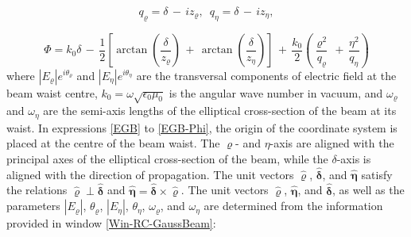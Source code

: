 \begin{equation}\label{EGB-qs}
	q_{\varrho} = \delta\,-\,iz_{\varrho}, \,\,\, q_{\eta} = \delta\,-\,iz_{\eta},
\end{equation}

\begin{equation}\label{EGB-Phi}
	\Phi = k_{0}\delta\,-\,\dfrac{1}{2}\left[\arctan\left(\frac{\delta}{z_{\varrho}}\right)\,+\,\arctan\left(\frac{\delta}{z_{\eta}}\right)\right]\,+\,\dfrac{k_{0}}{2}\left(\frac{\varrho^{2}}{q_{\varrho}}\,+\,\frac{\eta^{2}}{q_{\eta}}\right)
\end{equation}
where $|E_{\varrho}|e^{i\theta_{\varrho}}$ and $|E_{\eta}|e^{i\theta_{\eta}}$ are the transversal components of electric field at the beam waist centre, $k_{0} = \omega\sqrt{\epsilon_{0}\mu_{0}}$ is the angular wave number in vacuum, and $\omega_{\varrho}$ and $\omega_{\eta}$ are the semi-axis lengths of the elliptical cross-section of the beam at its waist. In expressions \eqref{EGB} to \eqref{EGB-Phi}, the origin of the coordinate system is placed at the centre of the beam waist. The $\varrho$- and $\eta$-axis are aligned with the principal axes of the elliptical cross-section of the beam, while the $\delta$-axis is aligned with the direction of propagation. The unit vectors $\mathbf{\hat{\varrho}}$, $\mathbf{\hat{\delta}}$, and $\mathbf{\hat{\eta}}$ satisfy the relations $\mathbf{\hat{\varrho}} \perp \mathbf{\hat{\delta}}$ and $\mathbf{\hat{\eta}} = \mathbf{\hat{\delta}} \times \mathbf{\hat{\varrho}}$. The unit vectors $\mathbf{\hat{\varrho}}$, $\mathbf{\hat{\eta}}$, and $\mathbf{\hat{\delta}}$, as well as the parameters $|E_{\varrho}|$, $\theta_{\varrho}$, $|E_{\eta}|$, $\theta_{\eta}$, $\omega_{\varrho}$, and $\omega_{\eta}$ are determined from the information provided in window \ref{Win-RC-GaussBeam}:
